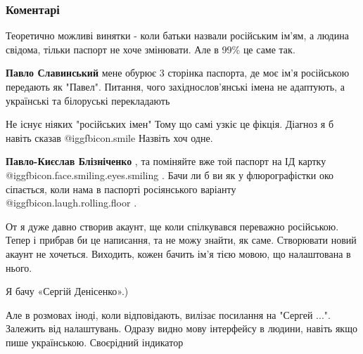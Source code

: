  
 
 
 
 
\subsubsection{Коментарі}

\begin{itemize} %
Теоретично можливі винятки - коли батьки назвали російським ім'ям, а людина свідома, тільки паспорт не хоче змінювати.
Але в 99\% це саме так.

\begin{itemize} %
\textbf{Павло Славинський} мене обурює 3 сторінка паспорта, де моє ім'я російською передають як "Павел". Питання, чого західнослов'янські імена не адаптують, а українські та білоруські перекладають

Не існує ніяких "російських імен" Тому що самі узкіє це фікція. Діагноз я б навіть сказав  @igg{fbicon.smile}  Назвіть хоч одне.

\textbf{Павло-Києслав Блізніченко} , та поміняйте вже той паспорт на ІД картку  @igg{fbicon.face.smiling.eyes.smiling} . Бачи ли б ви як у флюрографістки око сіпається, коли нама в паспорті росіянського варіанту  @igg{fbicon.laugh.rolling.floor} .
\end{itemize} %


От я дуже давно створив акаунт, ще коли спілкувався переважно російською. Тепер
і прибрав би це написання, та не можу знайти, як саме. Створювати новий акаунт
не хочеться. Виходить, кожен бачить ім'я тією мовою, що налаштована в нього.

\begin{itemize} %
Я бачу «Сергій Денісенко».)


Але в розмовах іноді, коли відповідають, вилізає посилання на "Сергей ...".
Залежить від налаштувань. Одразу видно мову інтерфейсу в людини, навіть якщо
пише українською. Своєрідний індикатор


\end{itemize}
\end{itemize}
